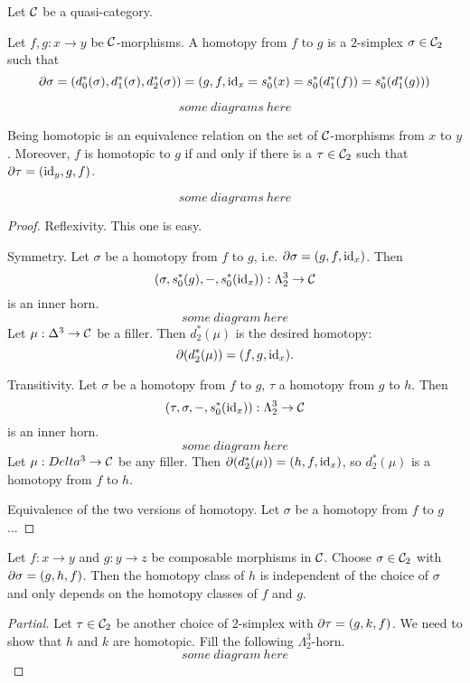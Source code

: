 Let $\mathcal{C}$ be a quasi-category.

Let $f,g:x\to y$ be $\mathcal{C}$-morphisms. A homotopy from $f$ to $g$ is a $2$-simplex $\sigma\in\mathcal{C}_2$ such that
\[\partial\sigma=(d_0^*(\sigma),d_1^*(\sigma),d_2^*(\sigma))=(g,f,\operatorname{id}_x=s_0^*(x)=s_0^*(d_1^*(f))=s_0^*(d_1^*(g)))\]

\[
some\ diagrams\ here
\]

\begin{proposition}
Being homotopic is an equivalence relation on the set of $\mathcal{C}$-morphisms from $x$ to $y$. Moreover, $f$ is homotopic to $g$ if and only if there is a $\tau\in\mathcal{C}_2$ such that $\partial\tau=(\operatorname{id}_y,g,f)$.

\[
some\ diagrams\ here
\]

\end{proposition}

\begin{proof}
Reflexivity. This one is easy.

Symmetry. Let $\sigma$ be a homotopy from $f$ to $g$, i.e. $\partial\sigma=(g,f,\operatorname{id}_x)$. Then
\[(\sigma,s_0^*(g),-,s_0^*(\operatorname{id}_x)):\Lambda^3_2\to\mathcal{C}\]
is an inner horn.
\[some\ diagram\ here\]
Let $\mu:\Delta^3\to\mathcal{C}$ be a filler. Then $d_2^*(\mu)$ is the desired homotopy:
\[\partial(d_2^*(\mu))=(f,g,\operatorname{id}_x).\]

Transitivity. Let $\sigma$ be a homotopy from $f$ to $g$, $\tau$ a homotopy from $g$ to $h$. Then
\[(\tau,\sigma,-,s_0^*(\operatorname{id}_x)):\Lambda^3_2\to\mathcal{C}\]
is an inner horn.
\[some\ diagram\ here\]
Let $\mu:Delta^3\to\mathcal{C}$ be any filler. Then $\partial(d_2^*(\mu))=(h,f,\operatorname{id}_x)$, so $d_2^*(\mu)$ is a homotopy from $f$ to $h$.

Equivalence of the two versions of homotopy. Let $\sigma$ be a homotopy from $f$ to $g$...
\end{proof}

\begin{proposition}
Let $f:x\to y$ and $g:y\to z$ be composable morphisms in $\mathcal{C}$. Choose $\sigma\in\mathcal{C}_2$ with $\partial\sigma=(g,h,f)$. Then the homotopy class of $h$ is independent of the choice of $\sigma$ and only depends on the homotopy classes of $f$ and $g$.
\end{proposition}

\begin{proof}[Partial]
Let $\tau\in\mathcal{C}_2$ be another choice of $2$-simplex with $\partial\tau=(g,k,f)$. We need to show that $h$ and $k$ are homotopic. Fill the following $\Lambda^3_2$-horn.
\[some\ diagram\ here\]
\end{proof}

